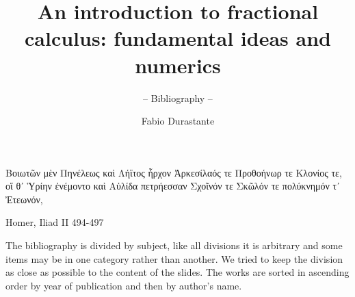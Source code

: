 \documentclass[10pt,a4paper]{scrartcl}
\title{An introduction to fractional calculus: fundamental ideas and numerics}
\subtitle{-- Bibliography --}
\author{Fabio Durastante}
\begin{document}
\maketitle

\epigraph{\begin{greektext}
	Βοιωτῶν μὲν Πηνέλεως καὶ Λήϊτος ἦρχον
	Ἀρκεσίλαός τε Προθοήνωρ τε Κλονίος τε,
	οἵ θ᾽ Ὑρίην ἐνέμοντο καὶ Αὐλίδα πετρήεσσαν
	Σχοῖνόν τε Σκῶλόν τε πολύκνημόν τ᾽ Ἐτεωνόν,
\end{greektext}}{Homer, Iliad II 494-497} 

\nocite{*}

The bibliography is divided by subject, like all divisions it is arbitrary and some items may be in one category rather than another. We tried to keep the division as close as possible to the content of the slides. The works are sorted in ascending order by year of publication and then by author's name.

\printbibliography[keyword=fode,title={Fractional Ordinary Differential Equations}]
\printbibliography[keyword=fpde,title={Fractional Partial Differential Equations}]
\printbibliography[keyword=randomwalk,title={Connection with random walks}]
\printbibliography[keyword=mittagleffler,title={Mittag-Leffler function}]
\printbibliography[keyword=toeplitz,title={Toeplitz, circulant and other structured matrices}]
\printbibliography[keyword=separability,title={HODLR and other hierarchical matrices}]
\printbibliography[keyword=matrixequation,title={Matrix equations: $AX + XB^T = C$, $AX + XA^T = C$}]
\printbibliography[keyword=application,title={Applications}]
\printbibliography[keyword=fundamentals,title={Toolbox}]

\end{document}
